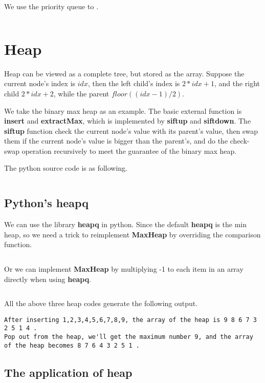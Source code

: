 \documentclass[11pt]{article}
\begin{document}
We use the priority queue to .

\inputminted{python}{src/maxSlidingWindow.py}

\section{Heap}
Heap can be viewed as a complete tree, but stored as the array. 
Suppose the current node's index is $idx$, then the left child's index is $2*idx+1$, and the right child $2*idx+2$, while the parent $floor((idx-1)/2)$.

We take the binary max heap as an example. 
The basic external function is \textbf{insert} and \textbf{extractMax}, which is implemented by \textbf{siftup} and \textbf{siftdown}. 
The \textbf{siftup} function check the current node's value with its parent's value, then swap them if the current node's value is bigger than the parent's, and do the check-swap operation recursively to meet the guarantee 
	of the binary max heap.
	
The python source code is as following.
\inputminted[breaklines=true,frame=leftline, linenos=true]{python}{src/heap.py}

\subsection{Python's heapq}
We can use the library \textbf{heapq} in python. 
Since the default \textbf{heapq} is the min heap, so we need a trick to reimplement \textbf{MaxHeap} by overriding the comparison function. 
\inputminted[breaklines=true,frame=leftline, linenos=true]{python}{src/heap_heapq.py}

Or we can implement \textbf{MaxHeap} by multiplying -1 to each item in an array directly when using \textbf{heapq}.

\inputminted[breaklines=true,frame=leftline, linenos=true]{python}{src/heap_heapq2.py}

All the above three heap codes generate the following output. 
\begin{verbatim}
After inserting 1,2,3,4,5,6,7,8,9, the array of the heap is 9 8 6 7 3 2 5 1 4 .
Pop out from the heap, we'll get the maximum number 9, and the array of the heap becomes 8 7 6 4 3 2 5 1 .
\end{verbatim}

\subsection{The application of heap}
\end{document}
